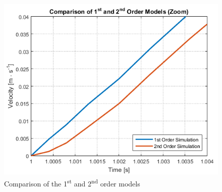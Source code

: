 \begin{minipage}{\linewidth}
\begin{minipage}{0.45\linewidth}
\begin{figure}[H]
    	 	\includegraphics[scale = .6]{figures/comparison1stAnd2ndOrderModelsZoom.png}
    	 	\caption{Comparison of the \si{1^{st}} and \si{2^{nd}} order models}
    	 	\label{fig:comparison1stAnd2ndOrderModelsZoom}
    	\end{figure}
  	\end{minipage}
  \end{minipage}

